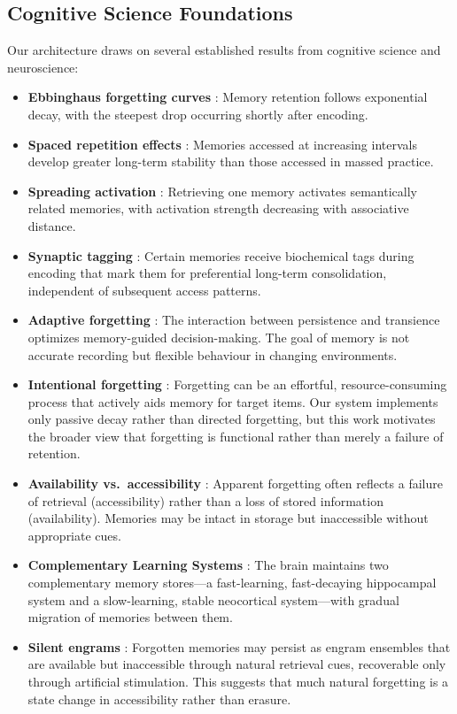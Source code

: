 \documentclass[11pt,a4paper]{article}
\begin{document}
\subsection{Cognitive Science Foundations}

Our architecture draws on several established results from cognitive science and neuroscience:

\begin{itemize}
    \item \textbf{Ebbinghaus forgetting curves} \citep{ebbinghaus1885, murre2015replication}: Memory retention follows exponential decay, with the steepest drop occurring shortly after encoding.
    \item \textbf{Spaced repetition effects} \citep{cepeda2006distributed}: Memories accessed at increasing intervals develop greater long-term stability than those accessed in massed practice.
    \item \textbf{Spreading activation} \citep{collins1975spreading}: Retrieving one memory activates semantically related memories, with activation strength decreasing with associative distance.
    \item \textbf{Synaptic tagging} \citep{frey1997synaptic}: Certain memories receive biochemical tags during encoding that mark them for preferential long-term consolidation, independent of subsequent access patterns.
    \item \textbf{Adaptive forgetting} \citep{richards2017persistence}: The interaction between persistence and transience optimizes memory-guided decision-making. The goal of memory is not accurate recording but flexible behaviour in changing environments.
    \item \textbf{Intentional forgetting} \citep{popov2019forgetting}: Forgetting can be an effortful, resource-consuming process that actively aids memory for target items. Our system implements only passive decay rather than directed forgetting, but this work motivates the broader view that forgetting is functional rather than merely a failure of retention.
    \item \textbf{Availability vs.\ accessibility} \citep{tulving1966availability}: Apparent forgetting often reflects a failure of retrieval (accessibility) rather than a loss of stored information (availability). Memories may be intact in storage but inaccessible without appropriate cues.
    \item \textbf{Complementary Learning Systems} \citep{mcclelland1995complementary}: The brain maintains two complementary memory stores---a fast-learning, fast-decaying hippocampal system and a slow-learning, stable neocortical system---with gradual migration of memories between them.
    \item \textbf{Silent engrams} \citep{ryan2022forgetting}: Forgotten memories may persist as engram ensembles that are available but inaccessible through natural retrieval cues, recoverable only through artificial stimulation. This suggests that much natural forgetting is a state change in accessibility rather than erasure.
\end{itemize}
\end{document}
